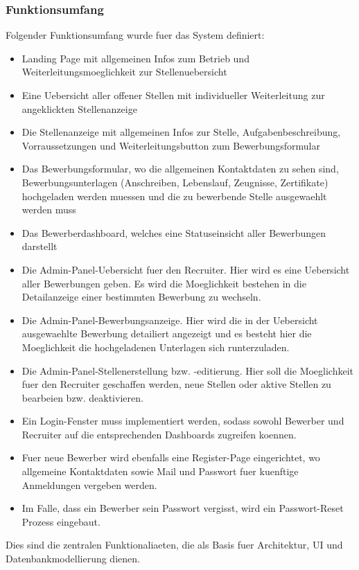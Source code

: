 \subsubsection{Funktionsumfang}
Folgender Funktionsumfang wurde fuer das System definiert:
\begin{itemize}
\item Landing Page mit allgemeinen Infos zum Betrieb und Weiterleitungsmoeglichkeit zur Stellenuebersicht 
\item Eine Uebersicht aller offener Stellen mit individueller Weiterleitung zur angeklickten Stellenanzeige
\item Die Stellenanzeige mit allgemeinen Infos zur Stelle, Aufgabenbeschreibung, Vorraussetzungen und Weiterleitungsbutton zum Bewerbungsformular
\item Das Bewerbungsformular, wo die allgemeinen Kontaktdaten zu sehen sind, Bewerbungsunterlagen (Anschreiben, Lebenslauf, Zeugnisse, Zertifikate) hochgeladen werden muessen und die zu bewerbende Stelle ausgewaehlt werden muss
\item Das Bewerberdashboard, welches eine Statuseinsicht aller Bewerbungen darstellt
\item Die Admin-Panel-Uebersicht fuer den Recruiter. Hier wird es eine Uebersicht aller Bewerbungen geben. Es wird die Moeglichkeit bestehen in die Detailanzeige einer bestimmten Bewerbung zu wechseln.
\item Die Admin-Panel-Bewerbungsanzeige. Hier wird die in der Uebersicht ausgewaehlte Bewerbung detailiert angezeigt und es besteht hier die Moeglichkeit die hochgeladenen Unterlagen sich runterzuladen.
\item Die Admin-Panel-Stellenerstellung bzw. -editierung. Hier soll die Moeglichkeit fuer den Recruiter geschaffen werden, neue Stellen oder aktive Stellen zu bearbeien bzw. deaktivieren.
\item Ein Login-Fenster muss implementiert werden, sodass sowohl Bewerber und Recruiter auf die entsprechenden Dashboards zugreifen koennen.
\item Fuer neue Bewerber wird ebenfalls eine Register-Page eingerichtet, wo allgemeine Kontaktdaten sowie Mail und Passwort fuer kuenftige Anmeldungen vergeben werden.
\item Im Falle, dass ein Bewerber sein Passwort vergisst, wird ein Passwort-Reset Prozess eingebaut.
\end{itemize}
Dies sind die zentralen Funktionaliaeten, die als Basis fuer Architektur, UI und Datenbankmodellierung dienen.
